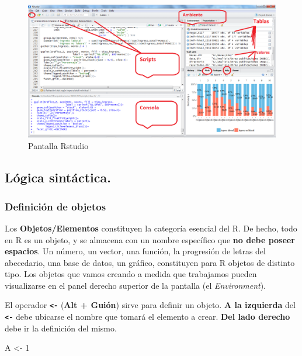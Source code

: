 \documentclass[]{book}
\newenvironment{Shaded}{\begin{snugshade}}{\end{snugshade}}
\newcommand{\DecValTok}[1]{\textcolor[rgb]{0.00,0.00,0.81}{#1}}
\newcommand{\NormalTok}[1]{#1}
\newcommand{\StringTok}[1]{\textcolor[rgb]{0.31,0.60,0.02}{#1}}
\begin{document}
\begin{figure}
\centering
\includegraphics[width=10.41667in,height=\textheight]{img/Pantalla Rstudio.png}
\caption{Pantalla Rstudio}
\end{figure}

\hypertarget{logica-sintactica.}{%
\subsection{Lógica sintáctica.}\label{logica-sintactica.}}

\hypertarget{definicion-de-objetos}{%
\subsubsection{Definición de objetos}\label{definicion-de-objetos}}

Los \textbf{Objetos/Elementos} constituyen la categoría esencial del R. De hecho, todo en R es un objeto, y se almacena con un nombre específico que \textbf{no debe poseer espacios}. Un número, un vector, una función, la progresión de letras del abecedario, una base de datos, un gráfico, constituyen para R objetos de distinto tipo. Los objetos que vamos creando a medida que trabajamos pueden visualizarse en el panel derecho superior de la pantalla (el \emph{Environment}).

El operador \textbf{\texttt{\textless{}-}} (\textbf{Alt + Guión}) sirve para definir un objeto. \textbf{A la izquierda} del \textbf{\texttt{\textless{}-}} debe ubicarse el nombre que tomará el elemento a crear. \textbf{Del lado derecho} debe ir la definición del mismo.

\begin{Shaded}
\begin{Highlighting}[]
\NormalTok{A <-}\StringTok{ }\DecValTok{1}
\end{Highlighting}
\end{Shaded}
\end{document}
